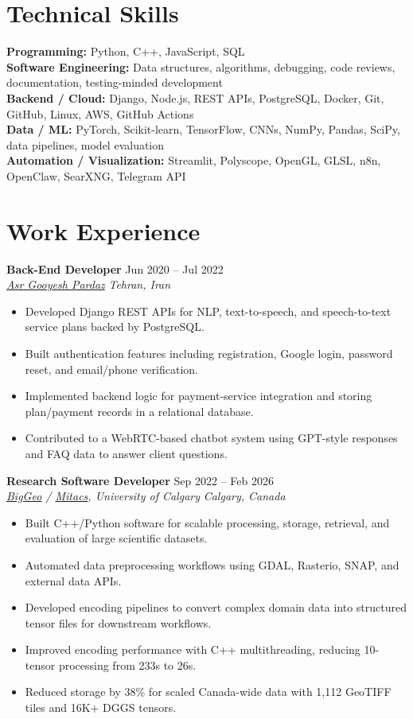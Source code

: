 \documentclass[a4paper,10pt]{article}
\newcommand{\resumeSubheading}[4]{
    \textbf{#1} \hfill #2 \\
    \textit{#3} \hfill \textit{#4}
}
\begin{document}
\section*{Technical Skills}

\textbf{Programming:} Python, C++, JavaScript, SQL \\
\textbf{Software Engineering:} Data structures, algorithms, debugging, code reviews, documentation, testing-minded development \\
\textbf{Backend / Cloud:} Django, Node.js, REST APIs, PostgreSQL, Docker, Git, GitHub, Linux, AWS, GitHub Actions \\
\textbf{Data / ML:} PyTorch, Scikit-learn, TensorFlow, CNNs, NumPy, Pandas, SciPy, data pipelines, model evaluation \\
\textbf{Automation / Visualization:} Streamlit, Polyscope, OpenGL, GLSL, n8n, OpenClaw, SearXNG, Telegram API


\section*{Work Experience}

\resumeSubheading
{Back-End Developer}
{Jun 2020 -- Jul 2022}
{\href{https://asr-gooyesh.com/en/}{Asr Gooyesh Pardaz}}
{Tehran, Iran}
\begin{itemize}[leftmargin=0.25in]
    \item Developed Django REST APIs for NLP, text-to-speech, and speech-to-text service plans backed by PostgreSQL.
    \item Built authentication features including registration, Google login, password reset, and email/phone verification.
    \item Implemented backend logic for payment-service integration and storing plan/payment records in a relational database.
    \item Contributed to a WebRTC-based chatbot system using GPT-style responses and FAQ data to answer client questions.
\end{itemize}

\resumeSubheading
{Research Software Developer}
{Sep 2022 -- Feb 2026}
{\href{https://biggeo.com}{BigGeo} / \href{https://www.mitacs.ca/}{Mitacs}, University of Calgary}
{Calgary, Canada}
\begin{itemize}[leftmargin=0.25in]
    \item Built C++/Python software for scalable processing, storage, retrieval, and evaluation of large scientific datasets.
    \item Automated data preprocessing workflows using GDAL, Rasterio, SNAP, and external data APIs.
    \item Developed encoding pipelines to convert complex domain data into structured tensor files for downstream workflows.
    \item Improved encoding performance with C++ multithreading, reducing 10-tensor processing from 233s to 26s.
    \item Reduced storage by 38\% for scaled Canada-wide data with 1,112 GeoTIFF tiles and 16K+ DGGS tensors.
\end{itemize}
\end{document}
